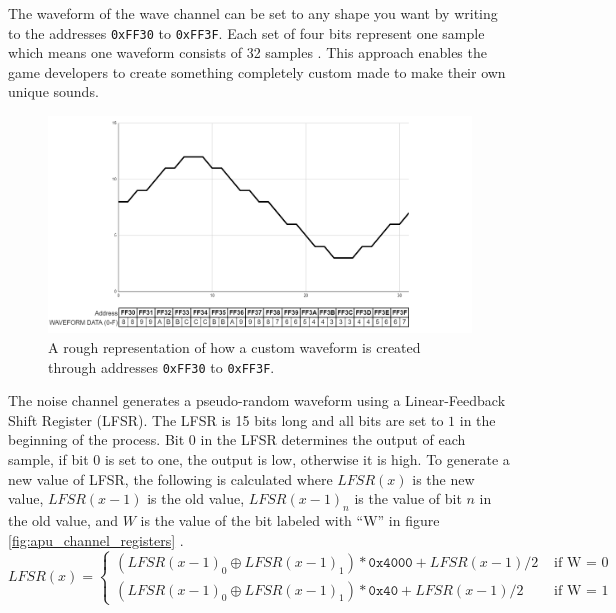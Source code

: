 The waveform of the wave channel can be set to any shape you want by writing to the addresses \texttt{0xFF30} to \texttt{0xFF3F}. Each set of four bits represent one sample which means one waveform consists of 32 samples \cite{AudioHardware}. This approach enables the game developers to create something completely custom made to make their own unique sounds.
\begin{figure}[H]
    \centering
    \includegraphics[width=1\textwidth]{figures/APU/apu_custom_waveform.png}
    \caption{A rough representation of how a custom waveform is created through addresses \texttt{0xFF30} to \texttt{0xFF3F}.}
    \label{fig:custom_wave_form}
\end{figure}

The noise channel generates a pseudo-random waveform using a Linear-Feedback Shift Register (LFSR). The LFSR is 15 bits long and all bits are set to $1$ in the beginning of the process. Bit 0 in the LFSR determines the output of each sample, if bit 0 is set to one, the output is low, otherwise it is high. To generate a new value of LFSR, the following is calculated where $LFSR(x)$ is the new value, $LFSR(x-1)$ is the old value, $LFSR(x-1)_n$ is the value of bit $n$ in the old value, and $W$ is the value of the bit labeled with ``W'' in figure \ref{fig:apu_channel_registers} \cite{AudioHardware}.
\begin{equation*}
    LFSR(x) =
    \begin{cases}
        (LFSR(x-1)_0 \oplus LFSR(x-1)_1)*\texttt{0x4000} + LFSR(x-1)/2 & \text{ if W = 0} \\
       (LFSR(x-1)_0 \oplus LFSR(x-1)_1)*\texttt{0x40} + LFSR(x-1)/2 & \text{ if W = 1}
    \end{cases}
\end{equation*}
